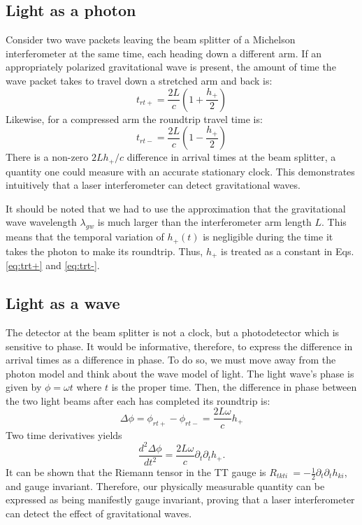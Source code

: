 \subsection{Light as a photon} 
Consider two wave packets leaving the beam splitter of a Michelson
interferometer at the same time, each heading down a different arm. If
an appropriately polarized gravitational wave is present, the amount
of time the wave packet takes to travel down a stretched arm and back
is:
\begin{equation}
\label{eq:trt+} 
t_{rt+} = \frac{2 L}{c} \left( 1 + \frac{h_+}{2} \right)
\end{equation}
Likewise, for a compressed arm the roundtrip travel time is:
\begin{equation}
\label{eq:trt-} 
t_{rt-} = \frac{2 L}{c} \left( 1 - \frac{h_+}{2} \right)
\end{equation}
There is a non-zero $2Lh_+/c$ difference in arrival times at the beam splitter, a quantity
one could measure with an accurate stationary clock. This demonstrates intuitively that
a laser interferometer can detect gravitational waves.

It should be noted that we had to use the approximation that the
gravitational wave wavelength $\lambda_{gw}$ is much larger than the
interferometer arm length $L$. This means that the temporal variation
of $h_+(t)$ is negligible during the time it takes the photon to make
its roundtrip. Thus, $h_+$ is treated as a constant in
Eqs. \ref{eq:trt+} and \ref{eq:trt-}.


\subsection{Light as a wave}
The detector at the beam splitter is not a clock, but a photodetector
which is sensitive to phase. It would be informative, therefore, to express
the difference in arrival times as a difference in phase. To do so, we
must move away from the photon model and think about the wave model of
light.  The light wave's phase is given by $\phi = \omega t$ where $t$ is the proper time. Then, the
difference in phase between the two light beams after each has
completed its roundtrip is:
\begin{equation}
\Delta \phi = \phi_{rt+} - \phi_{rt-} = \frac{2 L \omega}{c} h_+
\end{equation}
Two time derivatives yields 
\begin{equation}
\frac{d^2\Delta \phi}{dt^2} = \frac{2 L \omega}{c} \partial_t \partial_t h_+.
\end{equation}
It can be shown \cite{Garfinkle2005Gauge} that the Riemann tensor in
the TT gauge is $R_{tkti}~=-\frac{1}{2}\partial_t \partial_t h_{ki}$,
and gauge invariant. Therefore, our
physically measurable quantity can be expressed as being manifestly
gauge invariant, proving that a laser interferometer can detect the
effect of gravitational waves.





